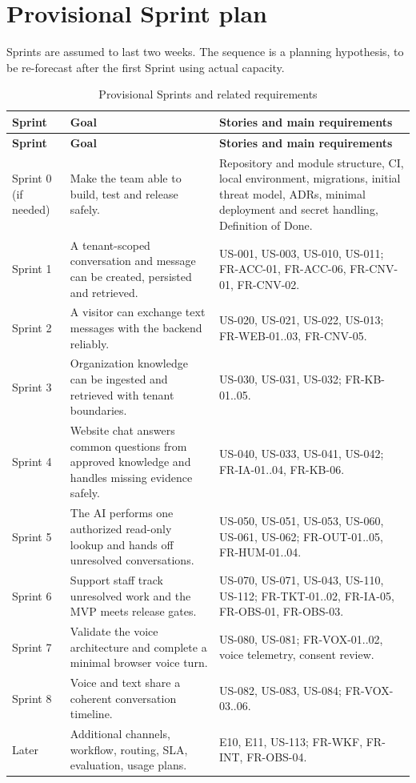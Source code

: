 \section{Provisional Sprint plan}
Sprints are assumed to last two weeks. The sequence is a planning hypothesis, to be re-forecast after the first Sprint using actual capacity.


\begin{longtable}{@{}p{2.4cm}p{6.8cm}p{6.8cm}@{}}
\caption{Provisional Sprints and related requirements}\label{tab:sprints}\\
\toprule \textbf{Sprint} & \textbf{Goal} & \textbf{Stories and main requirements} \\ \midrule \endfirsthead
\toprule \textbf{Sprint} & \textbf{Goal} & \textbf{Stories and main requirements} \\ \midrule \endhead
\bottomrule \endlastfoot
Sprint 0 (if needed) & Make the team able to build, test and release safely. & Repository and module structure, CI, local environment, migrations, initial threat model, ADRs, minimal deployment and secret handling, Definition of Done. \\
Sprint 1 & A tenant-scoped conversation and message can be created, persisted and retrieved. & US-001, US-003, US-010, US-011; FR-ACC-01, FR-ACC-06, FR-CNV-01, FR-CNV-02. \\
Sprint 2 & A visitor can exchange text messages with the backend reliably. & US-020, US-021, US-022, US-013; FR-WEB-01..03, FR-CNV-05. \\
Sprint 3 & Organization knowledge can be ingested and retrieved with tenant boundaries. & US-030, US-031, US-032; FR-KB-01..05. \\
Sprint 4 & Website chat answers common questions from approved knowledge and handles missing evidence safely. & US-040, US-033, US-041, US-042; FR-IA-01..04, FR-KB-06. \\
Sprint 5 & The AI performs one authorized read-only lookup and hands off unresolved conversations. & US-050, US-051, US-053, US-060, US-061, US-062; FR-OUT-01..05, FR-HUM-01..04. \\
Sprint 6 & Support staff track unresolved work and the MVP meets release gates. & US-070, US-071, US-043, US-110, US-112; FR-TKT-01..02, FR-IA-05, FR-OBS-01, FR-OBS-03. \\
Sprint 7 & Validate the voice architecture and complete a minimal browser voice turn. & US-080, US-081; FR-VOX-01..02, voice telemetry, consent review. \\
Sprint 8 & Voice and text share a coherent conversation timeline. & US-082, US-083, US-084; FR-VOX-03..06. \\
Later & Additional channels, workflow, routing, SLA, evaluation, usage plans. & E10, E11, US-113; FR-WKF, FR-INT, FR-OBS-04. \\
\end{longtable}

